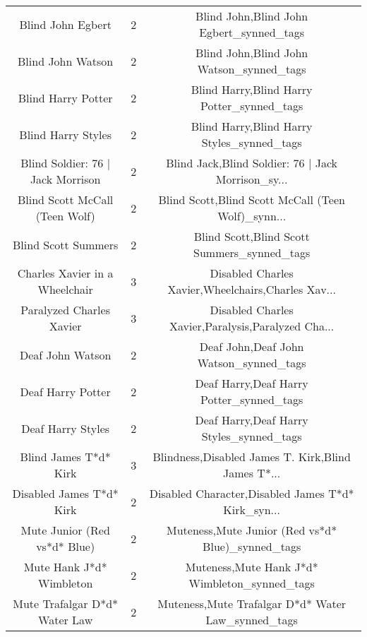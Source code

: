 \begin{table}[h!]
{\begin{tabular}{|c|c|c|}
                                 Blind John Egbert &          2 &           Blind John,Blind John Egbert\_synned\_tags \\
                                 Blind John Watson &          2 &           Blind John,Blind John Watson\_synned\_tags \\
                                Blind Harry Potter &          2 &         Blind Harry,Blind Harry Potter\_synned\_tags \\
                                Blind Harry Styles &          2 &         Blind Harry,Blind Harry Styles\_synned\_tags \\
                 Blind Soldier: 76 | Jack Morrison &          2 & Blind Jack,Blind Soldier: 76 | Jack Morrison\_sy... \\
                    Blind Scott McCall (Teen Wolf) &          2 & Blind Scott,Blind Scott McCall (Teen Wolf)\_synn... \\
                               Blind Scott Summers &          2 &        Blind Scott,Blind Scott Summers\_synned\_tags \\
                    Charles Xavier in a Wheelchair &          3 & Disabled Charles Xavier,Wheelchairs,Charles Xav... \\
                          Paralyzed Charles Xavier &          3 & Disabled Charles Xavier,Paralysis,Paralyzed Cha... \\
                                  Deaf John Watson &          2 &             Deaf John,Deaf John Watson\_synned\_tags \\
                                 Deaf Harry Potter &          2 &           Deaf Harry,Deaf Harry Potter\_synned\_tags \\
                                 Deaf Harry Styles &          2 &           Deaf Harry,Deaf Harry Styles\_synned\_tags \\
                             Blind James T*d* Kirk &          3 & Blindness,Disabled James T. Kirk,Blind James T*... \\
                          Disabled James T*d* Kirk &          2 & Disabled Character,Disabled James T*d* Kirk\_syn... \\
                      Mute Junior (Red vs*d* Blue) &          2 &  Muteness,Mute Junior (Red vs*d* Blue)\_synned\_tags \\
                          Mute Hank J*d* Wimbleton &          2 &      Muteness,Mute Hank J*d* Wimbleton\_synned\_tags \\
                     Mute Trafalgar D*d* Water Law &          2 & Muteness,Mute Trafalgar D*d* Water Law\_synned\_tags \\

\end{tabular}}
\end{table}
